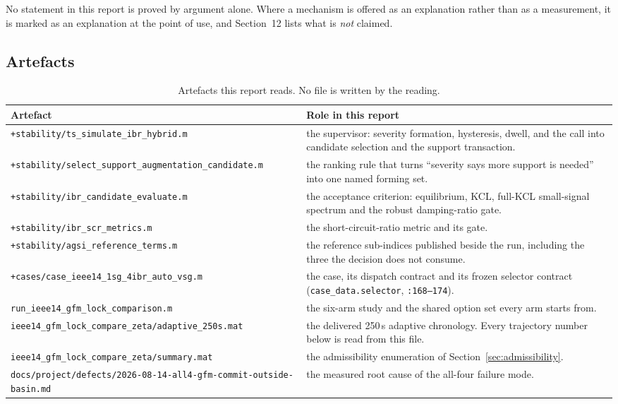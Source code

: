 \documentclass[12pt,a4paper]{article}
\theoremstyle{remark}
\newcommand{\code}[1]{\texttt{\small #1}}
\begin{document}
No statement in this report is proved by argument alone. Where a mechanism is
offered as an explanation rather than as a measurement, it is marked as an
explanation at the point of use, and Section~12 lists what is \emph{not}
claimed.

\subsection{Artefacts}

\begin{table}[H]
\centering
\small
\begin{tabularx}{\textwidth}{@{}lX@{}}
\toprule
\textbf{Artefact} & \textbf{Role in this report}\\
\midrule
\code{+stability/ts\_simulate\_ibr\_hybrid.m} &
  the supervisor: severity formation, hysteresis, dwell, and the call into
  candidate selection and the support transaction.\\
\code{+stability/select\_support\_augmentation\_candidate.m} &
  the ranking rule that turns ``severity says more support is needed'' into one
  named forming set.\\
\code{+stability/ibr\_candidate\_evaluate.m} &
  the acceptance criterion: equilibrium, KCL, full-KCL small-signal spectrum and
  the robust damping-ratio gate.\\
\code{+stability/ibr\_scr\_metrics.m} &
  the short-circuit-ratio metric and its gate.\\
\code{+stability/agsi\_reference\_terms.m} &
  the reference sub-indices published beside the run, including the three the
  decision does not consume.\\
\code{+cases/case\_ieee14\_1sg\_4ibr\_auto\_vsg.m} &
  the case, its dispatch contract and its frozen selector contract
  (\code{case\_data.selector}, \code{:168--174}).\\
\code{run\_ieee14\_gfm\_lock\_comparison.m} &
  the six-arm study and the shared option set every arm starts from.\\
\code{ieee14\_gfm\_lock\_compare\_zeta/adaptive\_250s.mat} &
  the delivered 250\,s adaptive chronology. Every trajectory number below is
  read from this file.\\
\code{ieee14\_gfm\_lock\_compare\_zeta/summary.mat} &
  the admissibility enumeration of Section~\ref{sec:admissibility}.\\
\code{docs/project/defects/2026-08-14-all4-gfm-commit-outside-basin.md} &
  the measured root cause of the all-four failure mode.\\
\bottomrule
\end{tabularx}
\caption{Artefacts this report reads. No file is written by the reading.}
\end{table}
\end{document}
